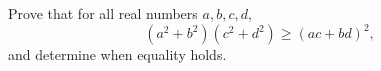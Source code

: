 Prove that for all real numbers $a,b,c,d$,
\[(a^2+b^2)(c^2+d^2)\ge(ac+bd)^2,\]
and determine when equality holds.

